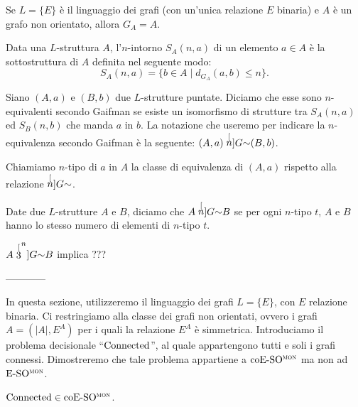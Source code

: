 \begin{osservazione}
  Se $L=\{E\}$ è il linguaggio dei grafi (con un'unica relazione $E$ binaria) e $A$ è un grafo non orientato, allora $G_A=A$.
\end{osservazione}

\begin{definizione}
  Data una $L$-struttura $A$, l'$n$-intorno $S_A(n,a)$ di un elemento $a\in A$ è la sottostruttura di $A$ definita nel seguente modo:
  \[ S_A(n,a) = \{ b\in A \mid d_{G_A}(a,b) \leq n \}. \]
\end{definizione}

\begin{definizione}
  Siano $(A,a)$ e $(B,b)$ due $L$-strutture puntate. Diciamo che esse sono $n$-equivalenti secondo Gaifman se esiste un isomorfismo di strutture tra $S_A(n,a)$ ed $S_B(n,b)$ che manda $a$ in $b$.
  La notazione che useremo per indicare la $n$-equivalenza secondo Gaifman è la seguente: $(A,a) \stackrel[n]{G}{\sim} (B,b)$.
\end{definizione}

\begin{definizione}
  Chiamiamo $n$-tipo di $a$ in $A$ la classe di equivalenza di $(A,a)$ rispetto alla relazione $\stackrel[n]{G}{\sim}$.
\end{definizione}

\begin{definizione}
  Date due $L$-strutture $A$ e $B$, diciamo che $A\stackrel[n]{G}{\sim} B$ se per ogni $n$-tipo $t$, $A$ e $B$ hanno lo stesso numero di elementi di $n$-tipo $t$.
\end{definizione}


\begin{teorema}
  $A \stackrel[3^n]{G}{\sim} B$ implica ???
\end{teorema}



------------


In questa sezione, utilizzeremo il linguaggio dei grafi $L=\{E\}$, con $E$ relazione binaria.
Ci restringiamo alla classe dei grafi non orientati, ovvero i grafi $A=(|A|,E^A)$ per i quali la relazione $E^A$ è simmetrica.
Introduciamo il problema decisionale ``$\operatorname{Connected}$'', al quale appartengono tutti e soli i grafi connessi.
Dimostreremo che tale problema appartiene a $\operatorname{coE-SO^{\normalfont\textsc{mon}}}$ ma non ad $\operatorname{E-SO^{\normalfont\textsc{mon}}}$.

\begin{lemma}
  $\operatorname{Connected} \in \operatorname{coE-SO^{\normalfont\textsc{mon}}}$.
\end{lemma}

